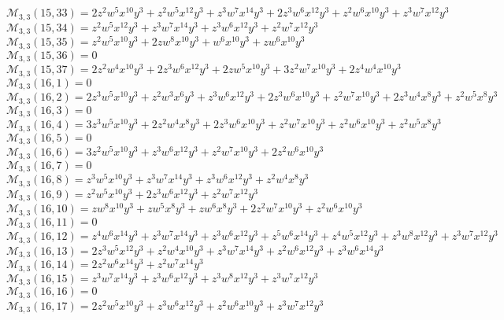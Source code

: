 $\mathcal{M}_{3,3}(15,33)=2z^2w^5x^{10}y^3+z^2w^5x^{12}y^3+z^3w^7x^{14}y^3+2z^3w^6x^{12}y^3+z^2w^6x^{10}y^3+z^3w^7x^{12}y^3$\\
$\mathcal{M}_{3,3}(15,34)=z^2w^5x^{12}y^3+z^3w^7x^{14}y^3+z^3w^6x^{12}y^3+z^2w^7x^{12}y^3$\\
$\mathcal{M}_{3,3}(15,35)=z^2w^5x^{10}y^3+2zw^8x^{10}y^3+w^6x^{10}y^3+zw^6x^{10}y^3$\\
$\mathcal{M}_{3,3}(15,36)=0$\\
$\mathcal{M}_{3,3}(15,37)=2z^2w^4x^{10}y^3+2z^3w^6x^{12}y^3+2zw^5x^{10}y^3+3z^2w^7x^{10}y^3+2z^4w^4x^{10}y^3$\\
$\mathcal{M}_{3,3}(16,1)=0$\\
$\mathcal{M}_{3,3}(16,2)=2z^3w^5x^{10}y^3+z^2w^3x^6y^3+z^3w^6x^{12}y^3+2z^3w^6x^{10}y^3+z^2w^7x^{10}y^3+2z^3w^4x^8y^3+z^2w^5x^8y^3$\\
$\mathcal{M}_{3,3}(16,3)=0$\\
$\mathcal{M}_{3,3}(16,4)=3z^3w^5x^{10}y^3+2z^2w^4x^8y^3+2z^3w^6x^{10}y^3+z^2w^7x^{10}y^3+z^2w^6x^{10}y^3+z^2w^5x^8y^3$\\
$\mathcal{M}_{3,3}(16,5)=0$\\
$\mathcal{M}_{3,3}(16,6)=3z^2w^5x^{10}y^3+z^3w^6x^{12}y^3+z^2w^7x^{10}y^3+2z^2w^6x^{10}y^3$\\
$\mathcal{M}_{3,3}(16,7)=0$\\
$\mathcal{M}_{3,3}(16,8)=z^3w^5x^{10}y^3+z^3w^7x^{14}y^3+z^3w^6x^{12}y^3+z^2w^4x^8y^3$\\
$\mathcal{M}_{3,3}(16,9)=z^2w^5x^{10}y^3+2z^3w^6x^{12}y^3+z^2w^7x^{12}y^3$\\
$\mathcal{M}_{3,3}(16,10)=zw^8x^{10}y^3+zw^5x^8y^3+zw^6x^8y^3+2z^2w^7x^{10}y^3+z^2w^6x^{10}y^3$\\
$\mathcal{M}_{3,3}(16,11)=0$\\
$\mathcal{M}_{3,3}(16,12)=z^4w^6x^{14}y^3+z^3w^7x^{14}y^3+z^3w^6x^{12}y^3+z^5w^6x^{14}y^3+z^4w^5x^{12}y^3+z^3w^8x^{12}y^3+z^3w^7x^{12}y^3$\\
$\mathcal{M}_{3,3}(16,13)=2z^3w^5x^{12}y^3+z^2w^4x^{10}y^3+z^3w^7x^{14}y^3+z^2w^6x^{12}y^3+z^3w^6x^{14}y^3$\\
$\mathcal{M}_{3,3}(16,14)=2z^2w^6x^{14}y^3+z^2w^7x^{14}y^3$\\
$\mathcal{M}_{3,3}(16,15)=z^3w^7x^{14}y^3+z^3w^6x^{12}y^3+z^3w^8x^{12}y^3+z^3w^7x^{12}y^3$\\
$\mathcal{M}_{3,3}(16,16)=0$\\
$\mathcal{M}_{3,3}(16,17)=2z^2w^5x^{10}y^3+z^3w^6x^{12}y^3+z^2w^6x^{10}y^3+z^3w^7x^{12}y^3$\\
